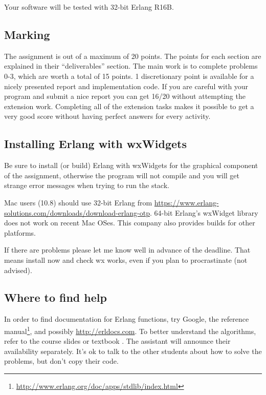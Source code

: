 \documentclass[a4paper]{article}
\begin{document}
Your software will be tested with 32-bit Erlang R16B.


\subsection*{Marking} %
\label{sub:marking}

The assignment is out of a maximum of 20 points. The points for each section
are explained in their ``deliverables'' section. The main work is to complete
problems 0-3, which are worth a total of 15 points. 1 discretionary point is
available for a nicely presented report and implementation code. If you
are careful with your program and submit a nice report you can get 16/20
without attempting the extension work. Completing all of the extension tasks
makes it possible to get a very good score without having perfect answers for
every activity.



\subsection*{Installing Erlang with wxWidgets} %
\label{sub:installing_erlang_and_wx}

Be sure to install (or build) Erlang with wxWidgets for the graphical
component of the assignment, otherwise the program will not compile and you
will get strange error messages when trying to run the stack.

Mac users (10.8) should use 32-bit Erlang from
\url{https://www.erlang-solutions.com/downloads/download-erlang-otp}. 64-bit
Erlang's wxWidget library does not work on recent Mac OSes. This
company also provides builds for other platforms.

If there are problems please let me know well in advance of the deadline.
That means install now and check wx works, even if you plan to procrastinate
(not advised).



\subsection*{Where to find help} %
\label{sub:where_to_find_help}

In order to find documentation for Erlang functions, try Google, the reference
manual\footnote{\url{http://www.erlang.org/doc/apps/stdlib/index.html}}, and
possibly \url{http://erldocs.com}.
To better understand the algorithms, refer to the course slides or textbook
\cite{cachin2011}.
The assistant will announce their availability separately.
It's ok to talk to the other students about how to solve the problems, but
don't copy their code.
\end{document}
